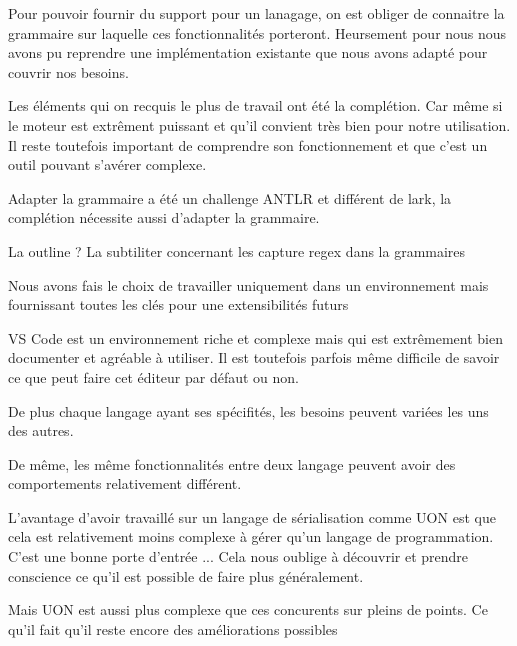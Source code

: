 \documentclass[
    iict, %
    il, %
]{heig-tb}
\begin{document}







Pour pouvoir fournir du support pour un lanagage, on est obliger de connaitre la grammaire sur laquelle ces fonctionnalités porteront.
Heursement pour nous nous avons pu reprendre une implémentation existante que nous avons adapté pour couvrir nos besoins.


Les éléments qui on recquis le plus de travail ont été la complétion.
Car même si le moteur est extrêment puissant et qu'il convient très bien pour notre utilisation. Il reste toutefois important de comprendre son fonctionnement et que c'est un outil pouvant s'avérer complexe.

Adapter la grammaire a été un challenge ANTLR et différent de lark, la complétion nécessite aussi d'adapter la grammaire.

La outline ?
La subtiliter concernant les capture regex dans la grammaires

Nous avons fais le choix de travailler uniquement dans un environnement mais fournissant toutes les clés pour une extensibilités futurs

VS Code est un environnement riche et complexe mais qui est extrêmement bien documenter et agréable à utiliser.
Il est toutefois parfois même difficile de savoir ce que peut faire cet éditeur par défaut ou non.




De plus chaque langage ayant ses spécifités, les besoins peuvent variées les uns des autres.

De même, les même fonctionnalités entre deux langage peuvent avoir des comportements relativement différent.

L'avantage d'avoir travaillé sur un langage de sérialisation comme UON est que cela est relativement moins complexe à gérer qu'un langage de programmation.
C'est une bonne porte d'entrée ...
Cela nous oublige à découvrir et prendre conscience ce qu'il est possible de faire plus généralement.

Mais UON est aussi plus complexe que ces concurents sur pleins de points.
Ce qu'il fait qu'il reste encore des améliorations possibles
\end{document}
